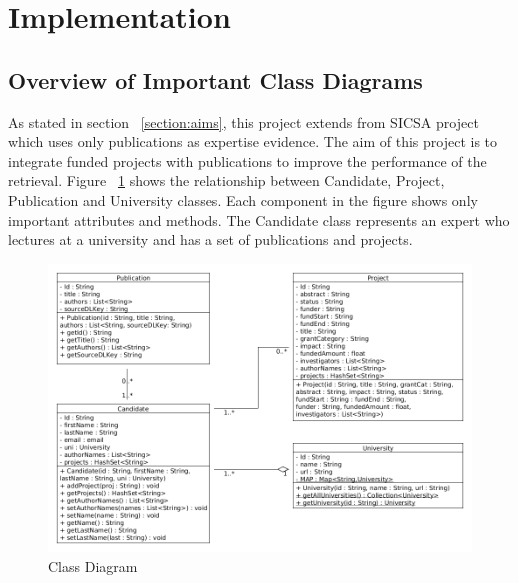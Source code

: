 
\section{Implementation}\label{section:designandimplementation}

\subsection{Overview of Important Class Diagrams}

As stated in section ~\ref{section:aims}, this project extends from SICSA project which uses only publications as expertise evidence.
The aim of this project is to integrate funded projects with publications to improve the performance of the retrieval.
Figure ~\ref{fig:classDiagram1} shows the relationship between Candidate, Project, Publication and University classes. Each component in the figure
shows only important attributes and methods. The Candidate class represents an expert who lectures at a university and has a set of publications and projects.
\begin{figure}
\centering
\includegraphics[scale=0.4]{./figures/classDiagram1.png}
\caption{Class Diagram} \label{fig:classDiagram1} 
\end{figure}

